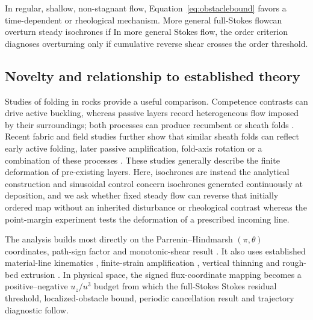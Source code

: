\documentclass[review]{igs}
\providecommand{\DIFadd}[1]{{\protect\color{blue} \sf #1}} %
\providecommand{\DIFdel}[1]{{\protect\color{red} \scriptsize #1}} %
\providecommand{\DIFaddbegin}{} %
\providecommand{\DIFaddend}{} %
\providecommand{\DIFdelbegin}{} %
\providecommand{\DIFdelend}{} %
\newcommand{\DIFscaledelfig}{0.5}
\newlength{\DIFdelgraphicswidth} %
\newlength{\DIFdelgraphicsheight} %
\newcommand{\DIFaddincludegraphics}[2][]{{\color{blue}\fbox{\DIFOincludegraphics[#1]{#2}}}} %
\newcommand{\DIFdelincludegraphics}[2][]{%
\sbox{\DIFdelgraphicsbox}{\DIFOincludegraphics[#1]{#2}}%
\settoboxwidth{\DIFdelgraphicswidth}{\DIFdelgraphicsbox} %
\settoboxtotalheight{\DIFdelgraphicsheight}{\DIFdelgraphicsbox} %
\scalebox{\DIFscaledelfig}{%
\parbox[b]{\DIFdelgraphicswidth}{\usebox{\DIFdelgraphicsbox}\\[-\baselineskip] \rule{\DIFdelgraphicswidth}{0em}}\llap{\resizebox{\DIFdelgraphicswidth}{\DIFdelgraphicsheight}{%
\setlength{\unitlength}{\DIFdelgraphicswidth}%
\begin{picture}(1,1)%
\thicklines\linethickness{2pt} %
{\color[rgb]{1,0,0}\put(0,0){\framebox(1,1){}}}%
{\color[rgb]{1,0,0}\put(0,0){\line( 1,1){1}}}%
{\color[rgb]{1,0,0}\put(0,1){\line(1,-1){1}}}%
\end{picture}%
}\hspace*{3pt}}} %
} %
\DeclareRobustCommand{\DIFaddbegin}{\DIFOaddbegin \let\includegraphics\DIFaddincludegraphics} %
\DeclareRobustCommand{\DIFaddend}{\DIFOaddend \let\includegraphics\DIFOincludegraphics} %
\DeclareRobustCommand{\DIFdelbegin}{\DIFOdelbegin \let\includegraphics\DIFdelincludegraphics} %
\DeclareRobustCommand{\DIFdelend}{\DIFOaddend \let\includegraphics\DIFOincludegraphics} %
\begin{document}
In regular, shallow, non-stagnant flow, Equation~\ref{eq:obstaclebound} favors a time-dependent or rheological mechanism. \DIFdelbegin \DIFdel{More general full-Stokes flowcan overturn steady isochrones if }\DIFdelend \DIFaddbegin \DIFadd{In more general Stokes flow, the order criterion diagnoses overturning only if cumulative }\DIFaddend reverse shear crosses the \DIFdelbegin \DIFdel{order }\DIFdelend threshold.


\subsection{Novelty and relationship to established theory}

Studies of folding in rocks provide a useful comparison. Competence contrasts can drive active buckling, whereas passive layers record heterogeneous flow imposed by their surroundings; both processes can produce recumbent or sheath folds \citep{Bastida2014,SchmalholzMancktelow2016,NabaviFossen2021}. Recent fabric and field studies further show that similar sheath folds can reflect early active folding, later passive amplification, fold-axis rotation or a combination of these processes \citep{Fazio2024,AlsopCondon2025}. These studies generally describe the finite deformation of pre-existing layers. Here, \DIFdelbegin \DIFdel{isochrones are instead }\DIFdelend \DIFaddbegin \DIFadd{the analytical construction and sinusoidal control concern isochrones }\DIFaddend generated continuously at deposition, \DIFdelbegin \DIFdel{and we ask whether fixed steady flow can reverse that initially ordered map without an inherited disturbance or rheological contrast}\DIFdelend \DIFaddbegin \DIFadd{whereas the point-margin experiment tests the deformation of a prescribed incoming line}\DIFaddend .

The analysis builds most directly on the Parrenin--Hindmarsh \((\pi,\theta)\) coordinates, path-sign factor and monotonic-shear result \citep{ParreninHindmarshRemy2006,ParreninHindmarsh2007}. It also uses established material-line kinematics \citep{Waddington2001}, finite-strain amplification \citep{JacobsonWaddington2004}, vertical thinning \citep{Parrenin2013,ParreninChungMartin2025} and rough-bed extrusion \citep{Gudmundsson1997linear}. In physical space, the signed flux-coordinate mapping becomes a positive--negative \(u_z/u^3\) budget from which the \DIFdelbegin \DIFdel{full-Stokes }\DIFdelend \DIFaddbegin \DIFadd{Stokes }\DIFaddend residual threshold, localized-obstacle bound, periodic cancellation result and trajectory diagnostic follow.
\end{document}
